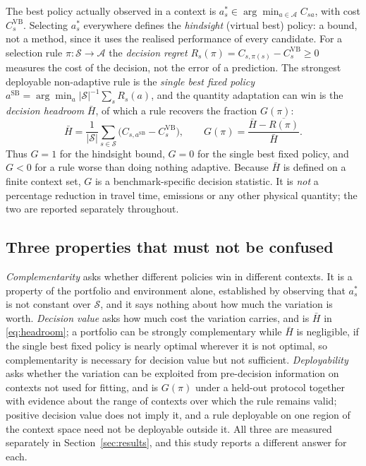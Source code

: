 \documentclass[runningheads]{llncs}
\begin{document}
The best policy actually observed in a context is
$a_s^{*}\in\arg\min_{a\in\mathcal{A}} C_{sa}$, with cost $C_{s}^{\mathrm{VB}}$. Selecting
$a_s^{*}$ everywhere defines the \emph{hindsight} (virtual best) policy: a bound, not a
method, since it uses the realised performance of every candidate. For a selection rule
$\pi:\mathcal{S}\rightarrow\mathcal{A}$ the \emph{decision regret}
$R_s(\pi)=C_{s,\pi(s)}-C^{\mathrm{VB}}_{s}\ge0$ measures the cost of the decision, not the
error of a prediction. The strongest deployable non-adaptive rule is the \emph{single best
fixed policy} $a^{\mathrm{SB}}=\arg\min_{a}|\mathcal{S}|^{-1}\sum_{s}R_s(a)$, and the
quantity adaptation can win is the \emph{decision headroom} $\bar H$, of which a rule
recovers the fraction $G(\pi)$:
\begin{equation}
\bar H=\frac{1}{|\mathcal{S}|}\sum_{s\in\mathcal{S}}
\bigl(C_{s,a^{\mathrm{SB}}}-C^{\mathrm{VB}}_{s}\bigr),
\qquad
G(\pi)=\frac{\bar H-\overline{R(\pi)}}{\bar H} .
\label{eq:headroom}
\end{equation}
Thus $G=1$ for the hindsight bound, $G=0$ for the single best fixed policy, and $G<0$ for
a rule worse than doing nothing adaptive. Because $\bar H$ is defined on a finite context
set, $G$ is a benchmark-specific decision statistic. It is \emph{not} a percentage
reduction in travel time, emissions or any other physical quantity; the two are reported
separately throughout.

\subsection{Three properties that must not be confused}

\emph{Complementarity} asks whether different policies win in different contexts. It is a
property of the portfolio and environment alone, established by observing that $a^{*}_{s}$
is not constant over $\mathcal{S}$, and it says nothing about how much the variation is
worth. \emph{Decision value} asks how much cost the variation carries, and is $\bar H$ in
\eqref{eq:headroom}; a portfolio can be strongly complementary while $\bar H$ is
negligible, if the single best fixed policy is nearly optimal wherever it is not optimal,
so complementarity is necessary for decision value but not sufficient.
\emph{Deployability} asks whether the variation can be exploited from pre-decision
information on contexts not used for fitting, and is $G(\pi)$ under a held-out protocol
together with evidence about the range of contexts over which the rule remains valid;
positive decision value does not imply it, and a rule deployable on one region of the
context space need not be deployable outside it. All three are measured separately in
Section~\ref{sec:results}, and this study reports a different answer for each.
\end{document}
